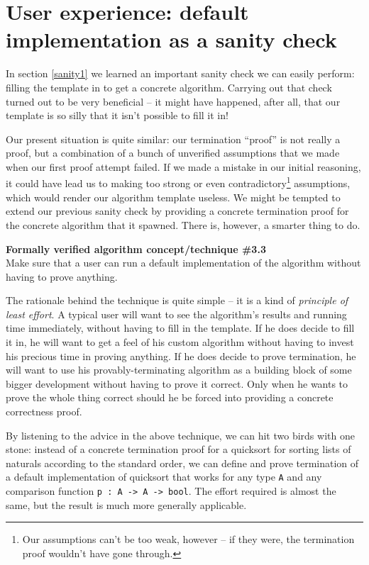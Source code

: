 \documentclass[declaration,mgr,english,shortabstract]{iithesis}
\newcommand{\m}[1]{\texttt{#1}}
\begin{document}
\section{User experience: default implementation as a sanity check} \label{sanity2}

In section \ref{sanity1} we learned an important sanity check we can easily perform: filling the template in to get a concrete algorithm. Carrying out that check turned out to be very beneficial -- it might have happened, after all, that our template is so silly that it isn't possible to fill it in!

Our present situation is quite similar: our termination ``proof'' is not really a proof, but a combination of a bunch of unverified assumptions that we made when our first proof attempt failed. If we made a mistake in our initial reasoning, it could have lead us to making too strong or even contradictory\footnote{Our assumptions can't be too weak, however -- if they were, the termination proof wouldn't have gone through.} assumptions, which would render our algorithm template useless. We might be tempted to extend our previous sanity check by providing a concrete termination proof for the concrete algorithm that it spawned. There is, however, a smarter thing to do.

\begin{center}
    \textbf{Formally verified algorithm concept/technique \#3.3} \\
    Make sure that a user can run a default implementation of the algorithm without having to prove anything.
\end{center}

The rationale behind the technique is quite simple -- it is a kind of \textit{principle of least effort}. A typical user will want to see the algorithm's results and running time immediately, without having to fill in the template. If he does decide to fill it in, he will want to get a feel of his custom algorithm without having to invest his precious time in proving anything. If he does decide to prove termination, he will want to use his provably-terminating algorithm as a building block of some bigger development without having to prove it correct. Only when he wants to prove the whole thing correct should he be forced into providing a concrete correctness proof.

By listening to the advice in the above technique, we can hit two birds with one stone: instead of a concrete termination proof for a quicksort for sorting lists of naturals according to the standard order, we can define and prove termination of a default implementation of quicksort that works for any type \m{A} and any comparison function \m{p\ :\ A -> A -> bool}. The effort required is almost the same, but the result is much more generally applicable.
\end{document}
